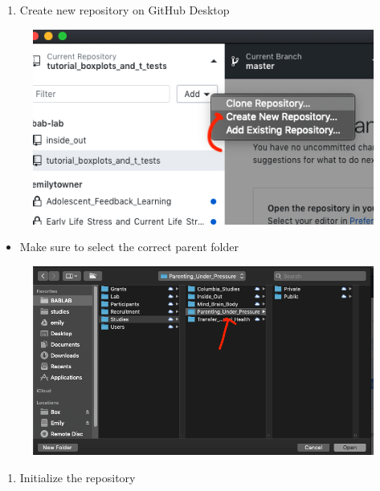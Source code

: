\documentclass[]{book}
\providecommand{\tightlist}{%
  \setlength{\itemsep}{0pt}\setlength{\parskip}{0pt}}
\begin{document}
\begin{enumerate}
\def\labelenumi{\arabic{enumi}.}
\setcounter{enumi}{1}
\tightlist
\item
  Create new repository on GitHub Desktop
\end{enumerate}

\begin{figure}
\centering
\includegraphics{images/research_protocols/github/2.png}
\caption{}
\end{figure}

\begin{itemize}
\tightlist
\item
  Make sure to select the correct parent folder
\end{itemize}

\begin{figure}
\centering
\includegraphics{images/research_protocols/github/3.png}
\caption{}
\end{figure}

\begin{enumerate}
\def\labelenumi{\arabic{enumi}.}
\setcounter{enumi}{2}
\tightlist
\item
  Initialize the repository
\end{enumerate}
\end{document}
